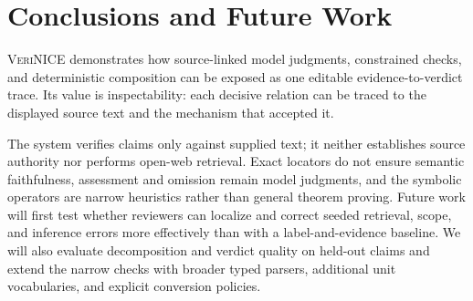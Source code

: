 \documentclass[letterpaper,twocolumn,10pt]{article}
\newcommand{\system}{\textsc{VeriNICE}}
\begin{document}
\section{Conclusions and Future Work}

\system{} demonstrates how source-linked model judgments, constrained checks,
and deterministic composition can be exposed as one editable evidence-to-verdict
trace. Its value is inspectability: each decisive relation can be traced to the
displayed source text and the mechanism that accepted it.

The system verifies claims only against supplied text; it neither establishes
source authority nor performs open-web retrieval. Exact locators do not ensure
semantic faithfulness, assessment and omission remain model judgments, and the
symbolic operators are narrow heuristics rather than general theorem proving.
Future work will first test whether reviewers can localize and correct seeded
retrieval, scope, and inference errors more effectively than with a
label-and-evidence baseline. We will also evaluate decomposition and verdict
quality on held-out claims and extend the narrow checks with broader typed
parsers, additional unit vocabularies, and explicit conversion policies.

\clearpage


\end{document}
